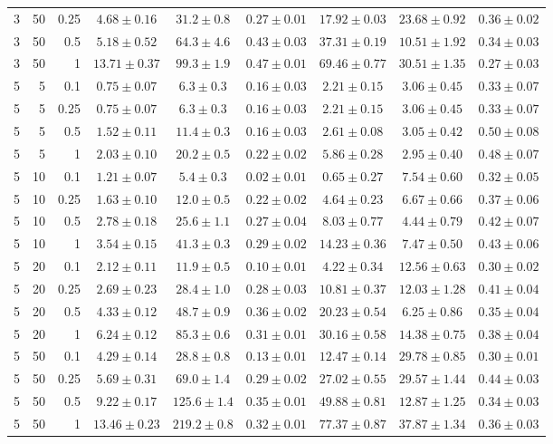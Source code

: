 \begin{table}[htbp]
\begin{tabular}{@{}rrrcccccc@{}}
3 & 50 & 0.25 & $4.68 \pm 0.16$ & $31.2 \pm 0.8$ & $0.27 \pm 0.01$ & $17.92 \pm 0.03$ & $23.68 \pm 0.92$ & $0.36 \pm 0.02$ \\
3 & 50 & 0.5 & $5.18 \pm 0.52$ & $64.3 \pm 4.6$ & $0.43 \pm 0.03$ & $37.31 \pm 0.19$ & $10.51 \pm 1.92$ & $0.34 \pm 0.03$ \\
3 & 50 & 1 & $13.71 \pm 0.37$ & $99.3 \pm 1.9$ & $0.47 \pm 0.01$ & $69.46 \pm 0.77$ & $30.51 \pm 1.35$ & $0.27 \pm 0.03$ \\
\midrule
5 & 5 & 0.1 & $0.75 \pm 0.07$ & $6.3 \pm 0.3$ & $0.16 \pm 0.03$ & $2.21 \pm 0.15$ & $3.06 \pm 0.45$ & $0.33 \pm 0.07$ \\
5 & 5 & 0.25 & $0.75 \pm 0.07$ & $6.3 \pm 0.3$ & $0.16 \pm 0.03$ & $2.21 \pm 0.15$ & $3.06 \pm 0.45$ & $0.33 \pm 0.07$ \\
5 & 5 & 0.5 & $1.52 \pm 0.11$ & $11.4 \pm 0.3$ & $0.16 \pm 0.03$ & $2.61 \pm 0.08$ & $3.05 \pm 0.42$ & $0.50 \pm 0.08$ \\
5 & 5 & 1 & $2.03 \pm 0.10$ & $20.2 \pm 0.5$ & $0.22 \pm 0.02$ & $5.86 \pm 0.28$ & $2.95 \pm 0.40$ & $0.48 \pm 0.07$ \\
5 & 10 & 0.1 & $1.21 \pm 0.07$ & $5.4 \pm 0.3$ & $0.02 \pm 0.01$ & $0.65 \pm 0.27$ & $7.54 \pm 0.60$ & $0.32 \pm 0.05$ \\
5 & 10 & 0.25 & $1.63 \pm 0.10$ & $12.0 \pm 0.5$ & $0.22 \pm 0.02$ & $4.64 \pm 0.23$ & $6.67 \pm 0.66$ & $0.37 \pm 0.06$ \\
5 & 10 & 0.5 & $2.78 \pm 0.18$ & $25.6 \pm 1.1$ & $0.27 \pm 0.04$ & $8.03 \pm 0.77$ & $4.44 \pm 0.79$ & $0.42 \pm 0.07$ \\
5 & 10 & 1 & $3.54 \pm 0.15$ & $41.3 \pm 0.3$ & $0.29 \pm 0.02$ & $14.23 \pm 0.36$ & $7.47 \pm 0.50$ & $0.43 \pm 0.06$ \\
5 & 20 & 0.1 & $2.12 \pm 0.11$ & $11.9 \pm 0.5$ & $0.10 \pm 0.01$ & $4.22 \pm 0.34$ & $12.56 \pm 0.63$ & $0.30 \pm 0.02$ \\
5 & 20 & 0.25 & $2.69 \pm 0.23$ & $28.4 \pm 1.0$ & $0.28 \pm 0.03$ & $10.81 \pm 0.37$ & $12.03 \pm 1.28$ & $0.41 \pm 0.04$ \\
5 & 20 & 0.5 & $4.33 \pm 0.12$ & $48.7 \pm 0.9$ & $0.36 \pm 0.02$ & $20.23 \pm 0.54$ & $6.25 \pm 0.86$ & $0.35 \pm 0.04$ \\
5 & 20 & 1 & $6.24 \pm 0.12$ & $85.3 \pm 0.6$ & $0.31 \pm 0.01$ & $30.16 \pm 0.58$ & $14.38 \pm 0.75$ & $0.38 \pm 0.04$ \\
5 & 50 & 0.1 & $4.29 \pm 0.14$ & $28.8 \pm 0.8$ & $0.13 \pm 0.01$ & $12.47 \pm 0.14$ & $29.78 \pm 0.85$ & $0.30 \pm 0.01$ \\
5 & 50 & 0.25 & $5.69 \pm 0.31$ & $69.0 \pm 1.4$ & $0.29 \pm 0.02$ & $27.02 \pm 0.55$ & $29.57 \pm 1.44$ & $0.44 \pm 0.03$ \\
5 & 50 & 0.5 & $9.22 \pm 0.17$ & $125.6 \pm 1.4$ & $0.35 \pm 0.01$ & $49.88 \pm 0.81$ & $12.87 \pm 1.25$ & $0.34 \pm 0.03$ \\
5 & 50 & 1 & $13.46 \pm 0.23$ & $219.2 \pm 0.8$ & $0.32 \pm 0.01$ & $77.37 \pm 0.87$ & $37.87 \pm 1.34$ & $0.36 \pm 0.03$ \\
\bottomrule
\end{tabular}
\end{table}
